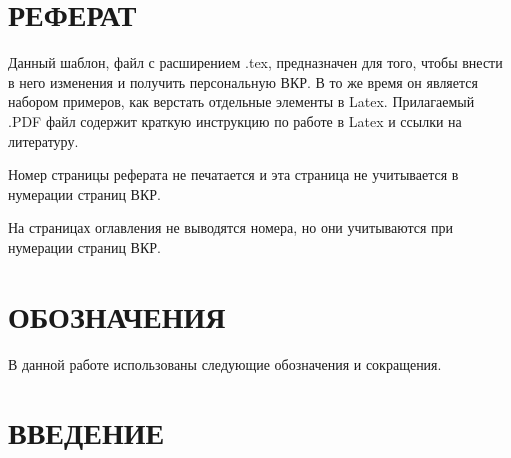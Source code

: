 \documentclass[a4paper,14pt,oneside]{book}
\theoremstyle{plain} %
\theoremstyle{definition} %
\theoremstyle{remark} %
\begin{document}




\pagestyle{plain}
\chapter*{РЕФЕРАТ}

\thispagestyle{empty}   %
Данный шаблон, файл с расширением .tex, предназначен для того, чтобы внести в него изменения и получить персональную ВКР. В то же время он является набором примеров, как верстать отдельные элементы в Latex. Прилагаемый .PDF файл содержит краткую инструкцию по работе в Latex и ссылки на литературу.

Номер страницы реферата не печатается и эта страница не учитывается в нумерации страниц ВКР.

На страницах оглавления не выводятся номера, но они учитываются при нумерации страниц ВКР.

\cleardoublepage               %

\renewcommand\contentsname{Содержание}
\tableofcontents

\cleardoublepage                    %

\setcounter{page}{4}  %

\chapter*{ОБОЗНАЧЕНИЯ}

В данной работе использованы следующие обозначения и сокращения.

\chapter*{ВВЕДЕНИЕ}
\end{document}
